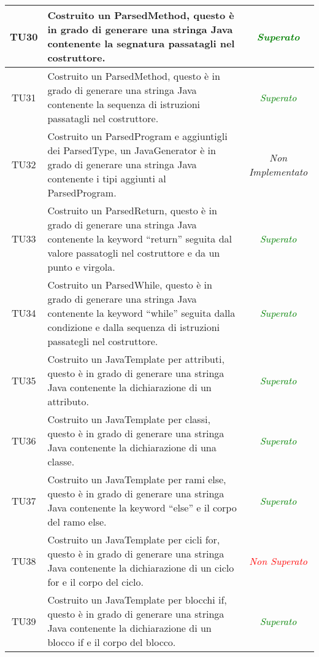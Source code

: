 \begin{longtable}{|c|>{}m{8cm}|c|}
\hypertarget{TU30}{TU30} & Costruito un ParsedMethod, questo è in grado di generare una stringa Java contenente la segnatura passatagli nel costruttore. & \textcolor{Green}{\textit{Superato}}\\ \hline
\hypertarget{TU31}{TU31} & Costruito un ParsedMethod, questo è in grado di generare una stringa Java contenente la sequenza di istruzioni passatagli nel costruttore. & \textcolor{Green}{\textit{Superato}}\\ \hline
\hypertarget{TU32}{TU32} & Costruito un ParsedProgram e aggiuntigli dei ParsedType, un JavaGenerator è in grado di generare una stringa Java contenente i tipi aggiunti al ParsedProgram. & \textit{Non Implementato}\\ \hline
\hypertarget{TU33}{TU33} & Costruito un ParsedReturn, questo è in grado di generare una stringa Java contenente la keyword ``return'' seguita dal valore passatogli nel costruttore e da un punto e virgola. & \textcolor{Green}{\textit{Superato}}\\ \hline
\hypertarget{TU34}{TU34} & Costruito un ParsedWhile, questo è in grado di generare una stringa Java contenente la keyword ``while'' seguita dalla condizione e dalla sequenza di istruzioni passategli nel costruttore. & \textcolor{Green}{\textit{Superato}}\\ \hline
\hypertarget{TU35}{TU35} & Costruito un JavaTemplate per attributi, questo è in grado di generare una stringa Java contenente la dichiarazione di un attributo. & \textcolor{Green}{\textit{Superato}}\\ \hline
\hypertarget{TU36}{TU36} & Costruito un JavaTemplate per classi, questo è in grado di generare una stringa Java contenente la dichiarazione di una classe. & \textcolor{Green}{\textit{Superato}}\\ \hline
\hypertarget{TU37}{TU37} & Costruito un JavaTemplate per rami else, questo è in grado di generare una stringa Java contenente la keyword ``else'' e il corpo del ramo else. & \textcolor{Green}{\textit{Superato}}\\ \hline
\hypertarget{TU38}{TU38} & Costruito un JavaTemplate per cicli for, questo è in grado di generare una stringa Java contenente la dichiarazione di un ciclo for e il corpo del ciclo. & \textcolor{Red}{\textit{Non Superato}}\\ \hline
\hypertarget{TU39}{TU39} & Costruito un JavaTemplate per blocchi if, questo è in grado di generare una stringa Java contenente la dichiarazione di un blocco if e il corpo del blocco. & \textcolor{Green}{\textit{Superato}}\\ \hline

\end{longtable}
